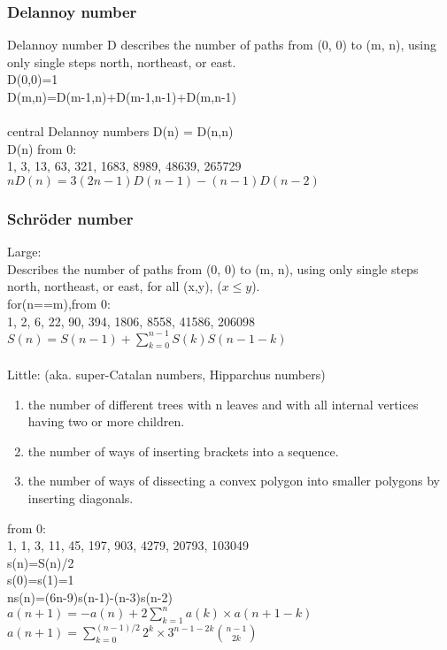 \subsubsection{Delannoy number}
Delannoy number D describes the number of paths from (0, 0) to (m, n), using only single steps north, northeast, or east.\\
D(0,0)=1\\
D(m,n)=D(m-1,n)+D(m-1,n-1)+D(m,n-1)\\
\\
central Delannoy numbers D(n) = D(n,n)\\
D(n) from 0:\\
1, 3, 13, 63, 321, 1683, 8989, 48639, 265729\\
$nD(n)=3(2n-1)D(n-1)-(n-1)D(n-2)$\\

\subsubsection{Schr\"{o}der number}
Large:\\
Describes the number of paths from (0, 0) to (m, n), using only single steps north, northeast, or east, for all (x,y), ($x\leq y$).\\
for(n==m),from 0:\\
1, 2, 6, 22, 90, 394, 1806, 8558, 41586, 206098\\
$S(n)=S(n-1)+\sum\limits_{k=0}^{n-1}S(k)S(n-1-k)$\\
\\

Little: (aka. super-Catalan numbers, Hipparchus numbers)\\
\begin{enumerate}
\item the number of different trees with n leaves and with all internal vertices having two or more children.
\item the number of ways of inserting brackets into a sequence.
\item the number of ways of dissecting a convex polygon into smaller polygons by inserting diagonals.
\end{enumerate}
from 0:\\
1, 1, 3, 11, 45, 197, 903, 4279, 20793, 103049\\
s(n)=S(n)/2\\
s(0)=s(1)=1\\
ns(n)=(6n-9)s(n-1)-(n-3)s(n-2)\\
$a(n+1)=-a(n)+2\sum\limits_{k=1}^na(k)\times a(n+1-k)$\\
$a(n+1)=\sum\limits_{k=0}^{(n-1)/2} 2^k\times 3^{n-1-2k}\binom{n-1}{2k}$\\

